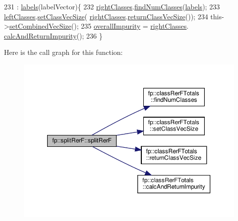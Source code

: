\begin{DoxyCode}
231                                                             : \hyperlink{classfp_1_1splitRerF_a85d708ae07bbfae5205111082e4037df}{labels}(labelVector)\{
232                     \hyperlink{classfp_1_1splitRerF_a8f78d6a0269d046328bead1cbf51be36}{rightClasses}.\hyperlink{classfp_1_1classRerFTotals_a8956cc79012353b8a56c21cf79fe83d0}{findNumClasses}(\hyperlink{classfp_1_1splitRerF_a85d708ae07bbfae5205111082e4037df}{labels});
233                     \hyperlink{classfp_1_1splitRerF_aa5aa4856a4bc8e5f0852d8e6fa935cfc}{leftClasses}.\hyperlink{classfp_1_1classRerFTotals_a51bf817a7dafd4dab98d9cfe3841a41d}{setClassVecSize}(
      \hyperlink{classfp_1_1splitRerF_a8f78d6a0269d046328bead1cbf51be36}{rightClasses}.\hyperlink{classfp_1_1classRerFTotals_a3f9028fdb2c7cc6d098a7dd565bf6e68}{returnClassVecSize}());
234                     this->\hyperlink{classfp_1_1splitRerF_aa1ccd2bea54313e731cfd85d4026c53c}{setCombinedVecSize}();
235                     \hyperlink{classfp_1_1splitRerF_a4b2291a2bf5d4bd6b7d45b0e7037c5cc}{overallImpurity} = \hyperlink{classfp_1_1splitRerF_a8f78d6a0269d046328bead1cbf51be36}{rightClasses}.
      \hyperlink{classfp_1_1classRerFTotals_acb145c7c137fecc8766b9616f80daff2}{calcAndReturnImpurity}();
236                 \}
\end{DoxyCode}
Here is the call graph for this function\+:
\nopagebreak
\begin{figure}[H]
\begin{center}
\leavevmode
\includegraphics[width=350pt]{classfp_1_1splitRerF_ab1ce3680d3e353a59d3efafd1a3064c2_cgraph}
\end{center}
\end{figure}


